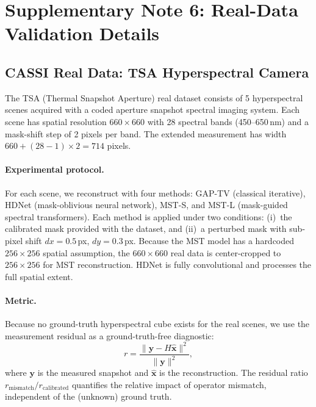 \documentclass[11pt]{article}
\begin{document}
\newpage

\section{Supplementary Note 6: Real-Data Validation Details}
\label{sec:realdata}

\subsection{CASSI Real Data: TSA Hyperspectral Camera}

The TSA (Thermal Snapshot Aperture) real dataset consists of 5 hyperspectral
scenes acquired with a coded aperture snapshot spectral imaging system.
Each scene has spatial resolution $660 \times 660$ with 28 spectral bands
(450--650\,nm) and a mask-shift step of 2 pixels per band.  The extended
measurement has width $660 + (28-1) \times 2 = 714$ pixels.

\paragraph{Experimental protocol.}
For each scene, we reconstruct with four methods: GAP-TV (classical
iterative), HDNet (mask-oblivious neural network), MST-S, and MST-L
(mask-guided spectral transformers).  Each method is applied under two
conditions: (i)~the calibrated mask provided with the dataset, and
(ii)~a perturbed mask with sub-pixel shift $dx = 0.5$\,px, $dy = 0.3$\,px.
Because the MST model has a hardcoded $256 \times 256$ spatial assumption,
the $660 \times 660$ real data is center-cropped to $256 \times 256$ for
MST reconstruction.  HDNet is fully convolutional and processes the full
spatial extent.

\paragraph{Metric.}
Because no ground-truth hyperspectral cube exists for the real scenes,
we use the measurement residual as a ground-truth-free diagnostic:
\begin{equation}
  r = \frac{\|\mathbf{y} - H\hat{\mathbf{x}}\|^2}{\|\mathbf{y}\|^2},
  \label{eq:meas_residual}
\end{equation}
where $\mathbf{y}$ is the measured snapshot and $\hat{\mathbf{x}}$ is the
reconstruction.  The residual ratio $r_{\mathrm{mismatch}} /
r_{\mathrm{calibrated}}$ quantifies the relative impact of operator
mismatch, independent of the (unknown) ground truth.
\end{document}
